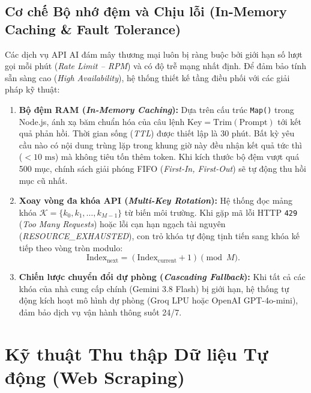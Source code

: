 \subsection{Cơ chế Bộ nhớ đệm và Chịu lỗi (In-Memory Caching \& Fault Tolerance)}

Các dịch vụ API AI đám mây thương mại luôn bị ràng buộc bởi giới hạn số lượt gọi mỗi phút (\textit{Rate Limit -- RPM}) và có độ trễ mạng nhất định. Để đảm bảo tính sẵn sàng cao (\textit{High Availability}), hệ thống thiết kế tầng điều phối với các giải pháp kỹ thuật:

\begin{enumerate}[leftmargin=1.2cm, itemsep=3pt]
    \item \textbf{Bộ đệm RAM (\textit{In-Memory Caching}):} Dựa trên cấu trúc \texttt{Map()} trong Node.js, ánh xạ băm chuẩn hóa của câu lệnh $\mathrm{Key} = \mathrm{Trim}(\mathrm{Prompt})$ tới kết quả phản hồi. Thời gian sống (\textit{TTL}) được thiết lập là 30 phút. Bất kỳ yêu cầu nào có nội dung trùng lặp trong khung giờ này đều nhận kết quả tức thì ($< 10\text{ ms}$) mà không tiêu tốn thêm token. Khi kích thước bộ đệm vượt quá 500 mục, chính sách giải phóng FIFO (\textit{First-In, First-Out}) sẽ tự động thu hồi mục cũ nhất.
    
    \item \textbf{Xoay vòng đa khóa API (\textit{Multi-Key Rotation}):} Hệ thống đọc mảng khóa $\mathcal{K} = \{k_0, k_1, \dots, k_{M-1}\}$ từ biến môi trường. Khi gặp mã lỗi HTTP \texttt{429} (\textit{Too Many Requests}) hoặc lỗi cạn hạn ngạch tài nguyên (\textit{RESOURCE\_EXHAUSTED}), con trỏ khóa tự động tịnh tiến sang khóa kế tiếp theo vòng tròn modulo:
    \begin{equation}
    \text{Index}_{\mathrm{next}} = (\text{Index}_{\mathrm{current}} + 1) \pmod M.
    \end{equation}
    
    \item \textbf{Chiến lược chuyển đổi dự phòng (\textit{Cascading Fallback}):} Khi tất cả các khóa của nhà cung cấp chính (Gemini 3.8 Flash) bị giới hạn, hệ thống tự động kích hoạt mô hình dự phòng (Groq LPU hoặc OpenAI GPT-4o-mini), đảm bảo dịch vụ vận hành thông suốt 24/7.
\end{enumerate}


\section{Kỹ thuật Thu thập Dữ liệu Tự động (Web Scraping)}

